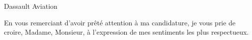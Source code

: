 \documentclass[11pt]{lettre}
\begin{document}
\begin{letter}{Dassault Aviation}





    
    \closing{En vous remerciant d’avoir prêté attention à ma candidature, je vous prie de croire, Madame, Monsieur, à l’expression de mes sentiments les plus respectueux.}
    
 
\end{letter}
 
\end{document}
